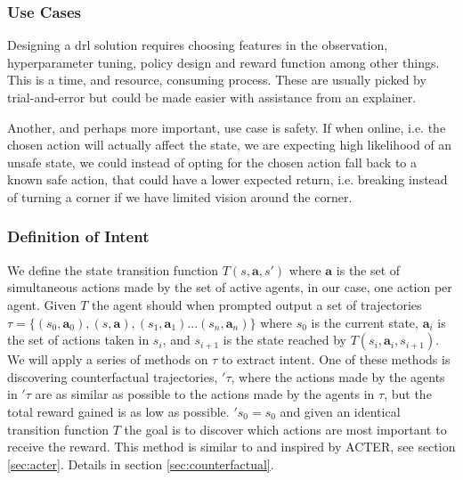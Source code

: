 \documentclass[UKenglish]{uiomasterthesis}
\begin{document}
\subsubsection{Use Cases}
Designing a \ac{drl} solution requires choosing features in the observation, hyperparameter tuning, policy design and reward function among other things. This is a time, and resource, consuming process. These are usually picked by trial-and-error but could be made easier with assistance from an explainer.

Another, and perhaps more important, use case is safety. If when online, i.e. the chosen action will actually affect the state, we are expecting high likelihood of an unsafe state, we could instead of opting for the chosen action fall back to a known safe action, that could have a lower expected return, i.e. breaking instead of turning a corner if we have limited vision around the corner.


\subsubsection{Definition of Intent}
We define the state transition function $T(s, \textbf{a}, s')$ where $\textbf{a}$ is the set of simultaneous actions made by the set of active agents, in our case, one action per agent. Given $T$ the agent should when prompted output a set of trajectories $\tau = \{(s_0,\textbf{a}_0),(s,\textbf{a}),(s_1,\textbf{a}_1)...(s_n,\textbf{a}_n)\}$ where $s_0$ is the current state, $\textbf{a}_i$ is the set of actions taken in $s_i$, and $s_{i+1}$ is the state reached by $T(s_i,\textbf{a}_i, s_{i+1})$. We will apply a series of methods on $\tau$ to extract intent. One of these methods is discovering counterfactual trajectories, $'\tau$, where the actions made by the agents in $'\tau$ are as similar as possible to the actions made by the agents in $\tau$, but the total reward gained is as low as possible. $'s_0 = s_0$ and given an identical transition function $T$ the goal is to discover which actions are most important to receive the reward. This method is similar to and inspired by ACTER\cite{gajcin2024acter}, see section \ref{sec:acter}. Details in section \ref{sec:counterfactual}.
\end{document}
